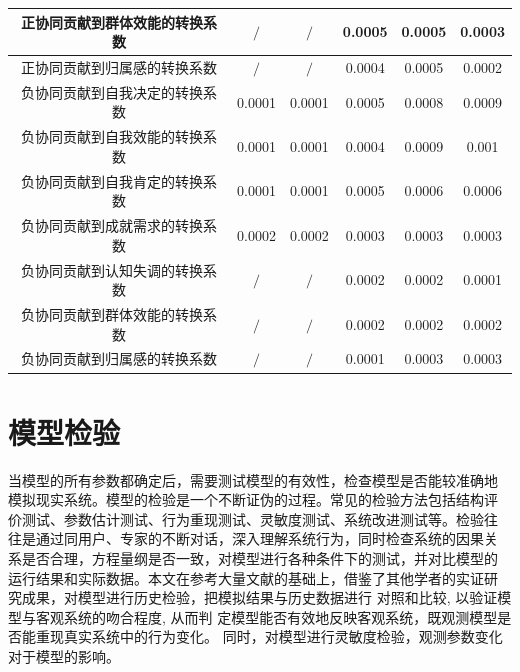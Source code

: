 \begin{table}[!htb]
\begin{tabular}{|c|c|c|c|c|c|}
\hline
正协同贡献到群体效能的转换系数 &   $\slash$          &   $\slash$          &      0.0005      &     0.0005       &      0.0003      \\
\hline
正协同贡献到归属感的转换系数 &    $\slash$         &      $\slash$       &       0.0004     &      0.0005      &      0.0002      \\
\hline
负协同贡献到自我决定的转换系数 &     0.0001       &     0.0001       &    0.0005        &      0.0008      &     0.0009       \\
\hline
负协同贡献到自我效能的转换系数 &      0.0001      &     0.0001       &    0.0004        &      0.0009      &        0.001    \\
\hline
负协同贡献到自我肯定的转换系数 &     0.0001       &      0.0001
&0.0005&  0.0006            &  0.0006          \\
\hline
负协同贡献到成就需求的转换系数 &      0.0002      &       0.0002     &     0.0003       &       0.0003     &      0.0003      \\
\hline
负协同贡献到认知失调的转换系数 &       $\slash$      &    $\slash$         &    0.0002        &     0.0002       &     0.0001       \\
\hline
负协同贡献到群体效能的转换系数 &   $\slash$          &       $\slash$      &    0.0002        &       0.0002     &    0.0002        \\
\hline
负协同贡献到归属感的转换系数 &      $\slash$       &       $\slash$      &      0.0001      &        0.0003    &      0.0003      \\
\hline
\end{tabular}  

  
  \label{tab:initail-value-transe}
\end{table}

\section{模型检验}

当模型的所有参数都确定后，需要测试模型的有效性，检查模型是否能较准确地
模拟现实系统。模型的检验是一个不断证伪的过程。常见的检验方法包括结构评
价测试、参数估计测试、行为重现测试、灵敏度测试、系统改进测试等。检验往
往是通过同用户、专家的不断对话，深入理解系统行为，同时检查系统的因果关
系是否合理，方程量纲是否一致，对模型进行各种条件下的测试，并对比模型的
运行结果和实际数据。本文在参考大量文献的基础上，借鉴了其他学者的实证研
究成果，对模型进行历史检验，把模拟结果与历史数据进行
对照和比较, 以验证模型与客观系统的吻合程度, 从而判
定模型能否有效地反映客观系统，既观测模型是否能重现真实系统中的行为变化。
同时，对模型进行灵敏度检验，观测参数变化对于模型的影响。



